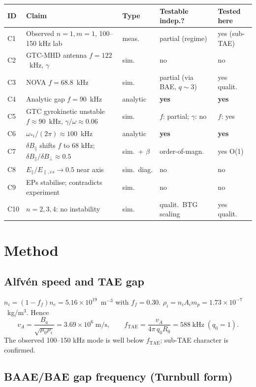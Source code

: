 \documentclass[11pt]{article}
\begin{document}
\begin{center}
\small
\begin{tabular}{lllll}
\toprule
ID & Claim & Type & Testable indep.? & Tested here \\
\midrule
C1 & Observed $n=1,m=1$, 100--150 kHz lab & meas.\ & partial (regime) & yes (sub-TAE) \\
C2 & GTC-MHD antenna $f{=}122$~kHz, $\gamma$ & sim.\ & no & no \\
C3 & NOVA $f{=}68.8$~kHz & sim.\ & partial (via BAE, $q{\sim}3$) & yes qualit.\ \\
C4 & Analytic gap $f{=}90$~kHz & analytic & \textbf{yes} & \textbf{yes} \\
C5 & GTC gyrokinetic unstable $f{\approx}90$~kHz, $\gamma/\omega{\approx}0.06$ & sim.\ & $f$: partial; $\gamma$: no & $f$: yes \\
C6 & $\omega_{*i}/(2\pi)\approx100$~kHz & analytic & \textbf{yes} & \textbf{yes} \\
C7 & $\delta B_\parallel$ shifts $f$ to 68 kHz; $\delta B_\parallel/\delta B_\perp\approx0.5$ & sim.\ + $\beta$ & order-of-magn.\ & yes O(1) \\
C8 & $E_\parallel/E_{\parallel,es}\to0.5$ near axis & sim.\ diag. & no & no \\
C9 & EPs stabilise; contradicts experiment & sim.\ & no & no \\
C10 & $n=2,3,4$: no instability & sim.\ & qualit.\ BTG scaling & yes qualit.\ \\
\bottomrule
\end{tabular}
\end{center}

\section{Method}

\subsection{Alfv\'en speed and TAE gap}

$n_i = (1 - f_f) n_e = 5.16\times10^{19}$~m$^{-3}$ with $f_f=0.30$. $\rho_i = n_i A_i m_p = 1.73\times10^{-7}$~kg/m$^3$. Hence
\[
v_A = \frac{B_a}{\sqrt{\mu_0 \rho_i}} = 3.69\times10^6\;\text{m/s},\qquad
f_{\mathrm{TAE}} = \frac{v_A}{4\pi\,q_0 R_0} = 588\;\text{kHz}\;(q_0{=}1).
\]
The observed 100--150 kHz mode is well below $f_{\mathrm{TAE}}$; sub-TAE character is confirmed.

\subsection{BAAE/BAE gap frequency (Turnbull form)}
\end{document}
